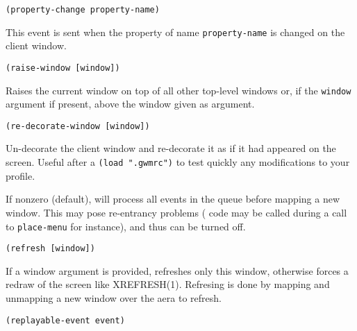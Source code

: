 {\usagefont\begin{verbatim}
(property-change property-name)
\end{verbatim}}\usageupspace

This event is sent when the property of name \verb"property-name" is changed
on the client window.

        
{\usagefont\begin{verbatim}
(raise-window [window])
\end{verbatim}}\usageupspace

Raises  the current window on top of all other top-level windows or, if the
\verb"window" argument if present, above the window given as argument.

        
{\usagefont\begin{verbatim}
(re-decorate-window [window])
\end{verbatim}}\usageupspace

Un-decorate the client window and re-decorate it as if it had appeared on
the screen. Useful after a \verb|(load ".gwmrc")| to test quickly any
modifications to your profile.

        

If nonzero (default), {\GWM} will process all events in the queue before
mapping a new window. This may pose re-entrancy problems ({\WOOL} code
may be called during a call to \verb"place-menu" for instance), and
thus can be turned off.

        
{\usagefont\begin{verbatim}
(refresh [window])
\end{verbatim}}\usageupspace

If a window argument is provided, refreshes only this window, otherwise 
forces a redraw of the screen like XREFRESH(1). Refresing is done by mapping
and unmapping a new window over the aera to refresh.


{\usagefont\begin{verbatim}
(replayable-event event)
\end{verbatim}}\usageupspace

